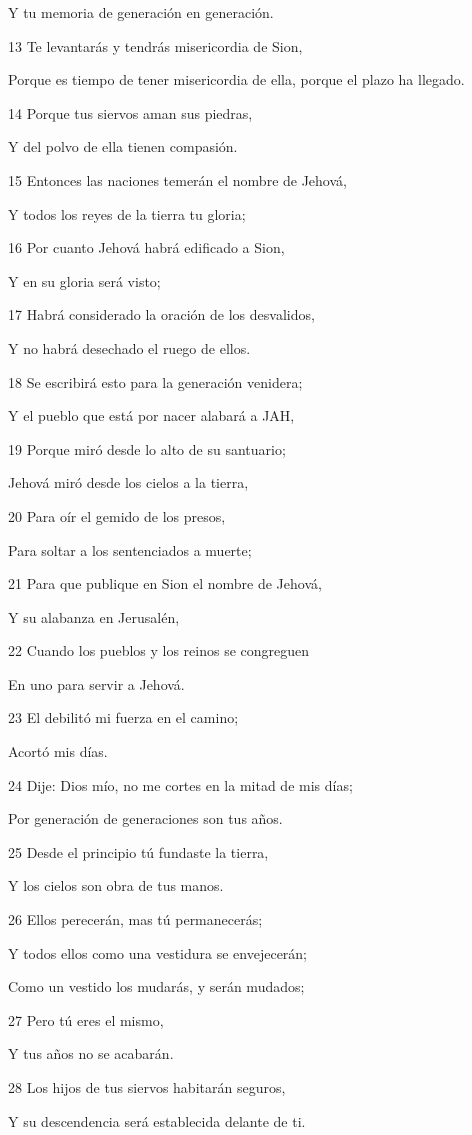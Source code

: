 \par Y tu memoria de generación en generación.
\par 13 Te levantarás y tendrás misericordia de Sion,
\par Porque es tiempo de tener misericordia de ella, porque el plazo ha llegado.
\par 14 Porque tus siervos aman sus piedras,
\par Y del polvo de ella tienen compasión.
\par 15 Entonces las naciones temerán el nombre de Jehová,
\par Y todos los reyes de la tierra tu gloria;
\par 16 Por cuanto Jehová habrá edificado a Sion,
\par Y en su gloria será visto;
\par 17 Habrá considerado la oración de los desvalidos,
\par Y no habrá desechado el ruego de ellos.
\par 18 Se escribirá esto para la generación venidera;
\par Y el pueblo que está por nacer alabará a JAH,
\par 19 Porque miró desde lo alto de su santuario;
\par Jehová miró desde los cielos a la tierra,
\par 20 Para oír el gemido de los presos,
\par Para soltar a los sentenciados a muerte;
\par 21 Para que publique en Sion el nombre de Jehová,
\par Y su alabanza en Jerusalén,
\par 22 Cuando los pueblos y los reinos se congreguen
\par En uno para servir a Jehová.
\par 23 El debilitó mi fuerza en el camino;
\par Acortó mis días.
\par 24 Dije: Dios mío, no me cortes en la mitad de mis días;
\par Por generación de generaciones son tus años.
\par 25 Desde el principio tú fundaste la tierra,
\par Y los cielos son obra de tus manos.
\par 26 Ellos perecerán, mas tú permanecerás;
\par Y todos ellos como una vestidura se envejecerán;
\par Como un vestido los mudarás, y serán mudados;
\par 27 Pero tú eres el mismo,
\par Y tus años no se acabarán.
\par 28 Los hijos de tus siervos habitarán seguros,
\par Y su descendencia será establecida delante de ti.

